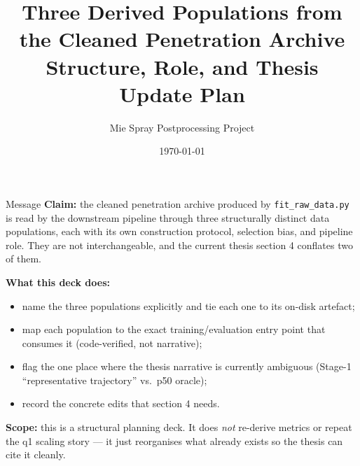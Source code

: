 \documentclass[UTF8,aspectratio=169]{ctexbeamer}
\title[Three Derived Populations]{Three Derived Populations from the Cleaned Penetration Archive\\Structure, Role, and Thesis Update Plan}
\author{Mie Spray Postprocessing Project}
\date{\today}
\newcommand{\warn}[1]{\textcolor{red!65!black}{#1}}
\begin{document}
\begin{frame}
  \titlepage
\end{frame}

\begin{frame}{Message}
\small
\textbf{Claim:} the cleaned penetration archive produced by \texttt{fit\_raw\_data.py} is read by the downstream pipeline through \warn{three structurally distinct data populations}, each with its own construction protocol, selection bias, and pipeline role. They are not interchangeable, and the current thesis section 4 conflates two of them.

\vspace{0.45em}
\textbf{What this deck does:}
\begin{itemize}
  \item name the three populations explicitly and tie each one to its on-disk artefact;
  \item map each population to the exact training/evaluation entry point that consumes it (code-verified, not narrative);
  \item flag the one place where the thesis narrative is currently ambiguous (Stage-1 ``representative trajectory'' vs.\ p50 oracle);
  \item record the concrete edits that section 4 needs.
\end{itemize}

\vspace{0.45em}
\textbf{Scope:} this is a structural planning deck. It does \emph{not} re-derive metrics or repeat the q1 scaling story --- it just reorganises what already exists so the thesis can cite it cleanly.
\end{frame}
\end{document}
